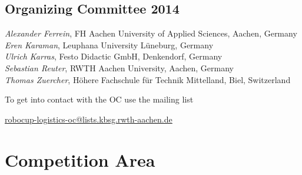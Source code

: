 \documentclass[12pt,twoside]{article}
\begin{document}
\subsection{Organizing Committee 2014} \label{sec:oc} 
\emph{Alexander Ferrein}, FH Aachen University of Applied Sciences,
Aachen, Germany\\
\emph{Eren Karaman}, Leuphana University Lüneburg, Germany\\
\emph{Ulrich Karras}, Festo Didactic GmbH, Denkendorf, Germany\\
\emph{Sebastian Reuter}, RWTH Aachen University, Aachen, Germany\\
\emph{Thomas Zuercher}, Höhere Fachschule für Technik Mittelland, Biel, Switzerland\\
\medskip

\noindent
To get into contact with the OC use the mailing list\\
\centerline{\url{robocup-logistics-oc@lists.kbsg.rwth-aachen.de}}




\section{Competition Area} \label{sec:area}
\end{document}
